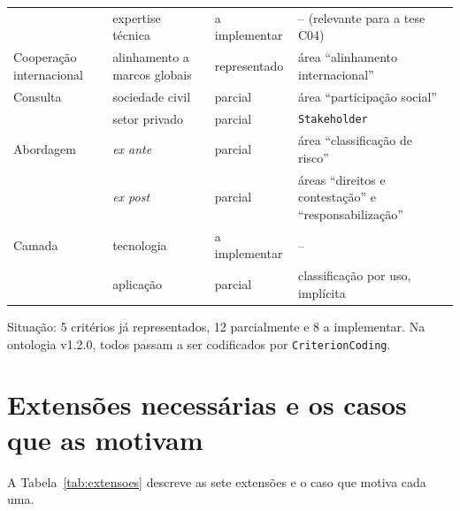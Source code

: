 \documentclass[12pt,a4paper,oneside,english,brazil]{abntex2}
\begin{document}
{\begin{longtable}{>{\raggedright\arraybackslash}p{30mm} >{\raggedright\arraybackslash}p{34mm} l >{\raggedright\arraybackslash}p{58mm}}
 & expertise técnica & a implementar & -- (relevante para a tese C04)\\
Cooperação internacional & alinhamento a marcos globais & representado & área ``alinhamento internacional''\\
Consulta & sociedade civil & parcial & área ``participação social''\\
 & setor privado & parcial & \texttt{Stakeholder}\\
Abordagem & \emph{ex ante} & parcial & área ``classificação de risco''\\
 & \emph{ex post} & parcial & áreas ``direitos e contestação'' e ``responsabilização''\\
Camada & tecnologia & a implementar & --\\
 & aplicação & parcial & classificação por uso, implícita\\
\end{longtable}}

\noindent Situação: 5 critérios já representados, 12 parcialmente e 8 a implementar. Na ontologia v1.2.0, todos passam a ser codificados por \texttt{CriterionCoding}.

\section{Extensões necessárias e os casos que as motivam}\label{sec:extensoes}
A Tabela~\ref{tab:extensoes} descreve as sete extensões e o caso que motiva cada uma.
\end{document}
